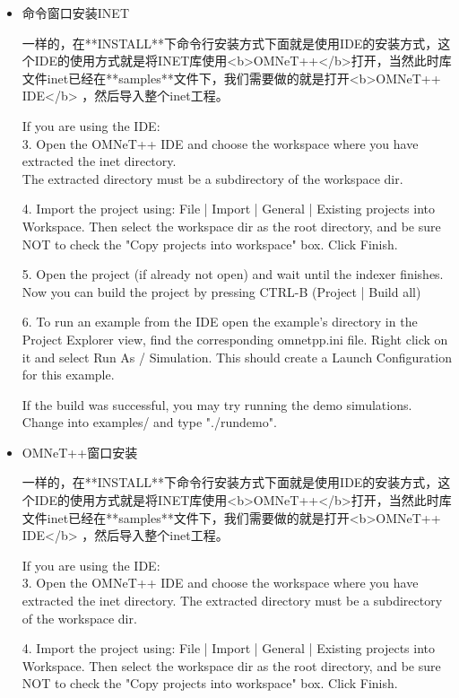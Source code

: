 \begin{itemize}
	\item 命令窗口安装INET
	
一样的，在**INSTALL**下命令行安装方式下面就是使用IDE的安装方式，这个IDE的使用方式就是将INET库使用<b>OMNeT++</b>打开，当然此时库文件inet已经在**samples**文件下，我们需要做的就是打开<b>OMNeT++ IDE</b> ，然后导入整个inet工程。
		
\begin{definition}
If you are using the IDE:\\
3. Open the OMNeT++ IDE and choose the workspace where you have extracted the inet directory.\\
The extracted directory must be a subdirectory of the workspace dir.

4. Import the project using: File | Import | General | Existing projects into Workspace.
Then select the workspace dir as the root directory, and be sure NOT to check the
"Copy projects into workspace" box. Click Finish.

5. Open the project (if already not open) and wait until the indexer finishes.
Now you can build the project by pressing CTRL-B (Project | Build all)

6. To run an example from the IDE open the example's directory in the Project Explorer view,
find the corresponding omnetpp.ini file. Right click on it and select Run As / Simulation.
This should create a Launch Configuration for this example.

If the build was successful, you may try running the demo simulations.
Change into examples/ and type "./rundemo".
\end{definition}
			
	\item OMNeT++窗口安装	
	
一样的，在**INSTALL**下命令行安装方式下面就是使用IDE的安装方式，这个IDE的使用方式就是将INET库使用<b>OMNeT++</b>打开，当然此时库文件inet已经在**samples**文件下，我们需要做的就是打开<b>OMNeT++ IDE</b> ，然后导入整个inet工程。
\begin{definition}
	If you are using the IDE:\\
	3. Open the OMNeT++ IDE and choose the workspace where you have extracted the inet directory.
	The extracted directory must be a subdirectory of the workspace dir.
	
	4. Import the project using: File | Import | General | Existing projects into Workspace.
	Then select the workspace dir as the root directory, and be sure NOT to check the
	"Copy projects into workspace" box. Click Finish.
	

\end{definition}
\end{itemize}
